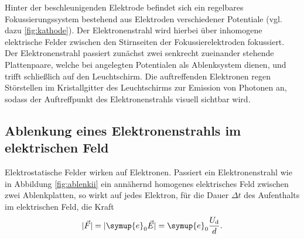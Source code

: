 Hinter der beschleunigenden Elektrode befindet sich ein regelbares Fokussierungssystem bestehend aus Elektroden verschiedener Potentiale (vgl. dazu \ref{fig:kathode}).
Der Elektronenstrahl wird hierbei über inhomogene elektrische Felder zwischen den Stirnseiten der Fokussierelektroden fokussiert.\\
Der Elektronenstrahl passiert zunächst zwei senkrecht zueinander stehende Plattenpaare, welche bei angelegten Potentialen als Ablenksystem dienen, und trifft schließlich auf den Leuchtschirm. Die auftreffenden Elektronen regen Störstellen im Kristallgitter des Leuchtschirms zur Emission von Photonen an, sodass der Auftreffpunkt des Elektronenstrahls visuell sichtbar wird.
\subsection{Ablenkung eines Elektronenstrahls im elektrischen Feld}
Elektrostatische Felder wirken auf Elektronen. Passiert ein Elektronenstrahl wie in Abbildung \ref{fig:ablenkii} ein annähernd homogenes elektrisches Feld zwischen zwei Ablenkplatten, so wirkt auf jedes Elektron, für die Dauer $\Delta t$ des Aufenthalts im elektrischen Feld, die Kraft
\begin{equation}
  |\vec{F}|=|\symup{e}_0\vec{E}|=\symup{e}_0\frac{U_\mathrm{d}}{d}\text{.}
\end{equation}

